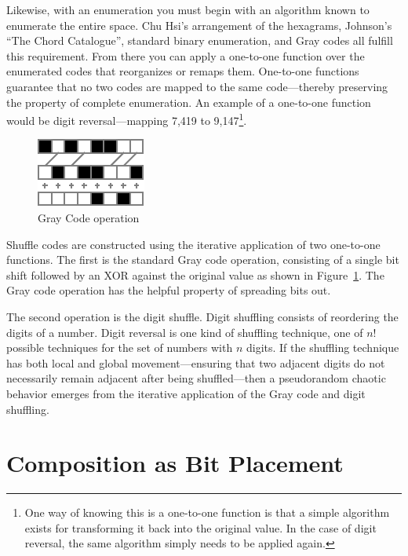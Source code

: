 \documentclass{thesis}
\begin{document}
Likewise, with an enumeration you must begin with an algorithm known to enumerate the entire space. Chu Hsi's arrangement of the hexagrams, Johnson's ``The Chord Catalogue'', standard binary enumeration, and Gray codes all fulfill this requirement. From there you can apply a one-to-one function over the enumerated codes that reorganizes or remaps them. One-to-one functions guarantee that no two codes are mapped to the same code---thereby preserving the property of complete enumeration. An example of a one-to-one function would be digit reversal---mapping 7,419 to 9,147\footnote{One way of knowing this is a one-to-one function is that a simple algorithm exists for transforming it back into the original value. In the case of digit reversal, the same algorithm simply needs to be applied again.}.

\begin{figure}
	\begin{center}
		\includegraphics[scale=1.5]{graphics/gray-operation.pdf}
		\caption{Gray Code operation}
		\label{gray-operation}
	\end{center}
\end{figure}

Shuffle codes are constructed using the iterative application of two one-to-one functions. The first is the standard Gray code operation, consisting of a single bit shift followed by an XOR against the original value as shown in Figure~\ref{gray-operation}. The Gray code operation has the helpful property of spreading bits out.

The second operation is the digit shuffle. Digit shuffling consists of reordering the digits of a number. Digit reversal is one kind of shuffling technique, one of $n!$ possible techniques for the set of numbers with $n$ digits. If the shuffling technique has both local and global movement---ensuring that two adjacent digits do not necessarily remain adjacent after being shuffled---then a pseudorandom chaotic behavior emerges from the iterative application of the Gray code and digit shuffling.

\section{Composition as Bit Placement}
\end{document}
